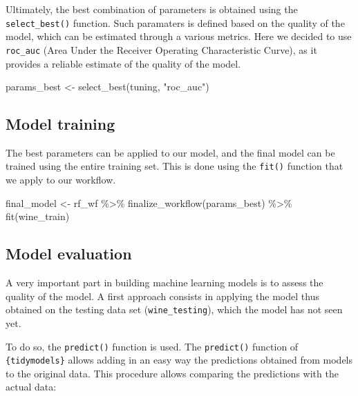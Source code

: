 \documentclass[
]{krantz}
\makeatletter
\newenvironment{Shaded}{\begin{snugshade}}{\end{snugshade}}
\newcommand{\FunctionTok}[1]{\textcolor[rgb]{0,0,0}{#1}}
\newcommand{\NormalTok}[1]{#1}
\newcommand{\OtherTok}[1]{\textcolor[rgb]{0.37,0.37,0.37}{#1}}
\newcommand{\SpecialCharTok}[1]{\textcolor[rgb]{0,0,0}{#1}}
\newcommand{\StringTok}[1]{\textcolor[rgb]{0.5,0.5,0.5}{#1}}
\newenvironment{kframe}{%
\medskip{}
\setlength{\fboxsep}{.8em}
 \def\at@end@of@kframe{}%
 \ifinner\ifhmode%
  \def\at@end@of@kframe{\end{minipage}}%
  \begin{minipage}{\columnwidth}%
 \fi\fi%
 \def\FrameCommand##1{\hskip\@totalleftmargin \hskip-\fboxsep
 \colorbox{shadecolor}{##1}\hskip-\fboxsep
     \hskip-\linewidth \hskip-\@totalleftmargin \hskip\columnwidth}%
 \MakeFramed {\advance\hsize-\width
   \@totalleftmargin\z@ \linewidth\hsize
   \@setminipage}}%
 {\par\unskip\endMakeFramed%
 \at@end@of@kframe}
\renewenvironment{Shaded}{\begin{kframe}}{\end{kframe}}
\makeatother
\begin{document}
Ultimately, the best combination of parameters is obtained using the \texttt{select\_best()} function. Such paramaters is defined based on the quality of the model, which can be estimated through a various metrics. Here we decided to use \texttt{roc\_auc} (Area Under the Receiver Operating Characteristic Curve), as it provides a reliable estimate of the quality of the model.

\begin{Shaded}
\begin{Highlighting}[]
\NormalTok{params\_best }\OtherTok{\textless{}{-}} \FunctionTok{select\_best}\NormalTok{(tuning, }\StringTok{"roc\_auc"}\NormalTok{)}
\end{Highlighting}
\end{Shaded}

\hypertarget{model-training}{%
\subsection{Model training}\label{model-training}}

The best parameters can be applied to our model, and the final model can be trained using the entire training set. This is done using the \texttt{fit()} function that we apply to our workflow.

\begin{Shaded}
\begin{Highlighting}[]
\NormalTok{final\_model }\OtherTok{\textless{}{-}}\NormalTok{ rf\_wf }\SpecialCharTok{\%\textgreater{}\%}
  \FunctionTok{finalize\_workflow}\NormalTok{(params\_best) }\SpecialCharTok{\%\textgreater{}\%}
  \FunctionTok{fit}\NormalTok{(wine\_train)}
\end{Highlighting}
\end{Shaded}

\hypertarget{model-evaluation}{%
\subsection{Model evaluation}\label{model-evaluation}}

A very important part in building machine learning models is to assess the quality of the model. A first approach consists in applying the model thus obtained on the testing data set (\texttt{wine\_testing}), which the model has not seen yet.

To do so, the \texttt{predict()} function is used. The \texttt{predict()} function of \texttt{\{tidymodels\}} allows adding in an easy way the predictions obtained from models to the original data. This procedure allows comparing the predictions with the actual data:
\end{document}
